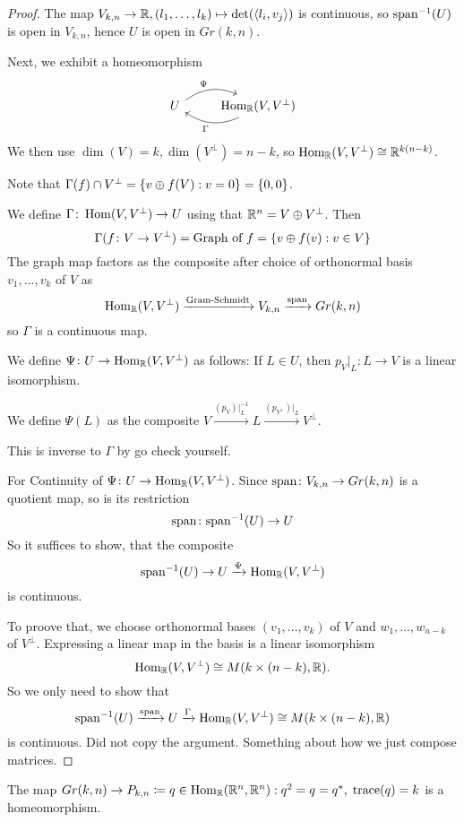 \documentclass[language=english]{TemplateLecture}
\begin{document}
\begin{proof}
    The map \(V_{k,n} \to \mathbb{R}, (l_1, \dots, l_k) \mapsto \det(\langle l_i, v_j\rangle)\) is continuous, so \(\mathrm{span}^{-1}(U)\) is open in \(V_{k,n}\), hence \(U\) is open in \(Gr(k,n)\).

    Next, we exhibit a homeomorphism
    \[\begin{tikzcd}
        U \ar[r, bend left, "\Psi"] & {\Hom_\IR(V, V^\perp)} \ar[l, bend left, "\Gamma"]
    \end{tikzcd}\]
    We then use \(\dim(V) = k, \dim(V^\perp) = n-k\), so \(\operatorname{Hom}_{\mathbb{R}}(V, V^\perp) \cong \mathbb{R}^{k(n-k)}\).

    Note that \(\Gamma(f) \cap V^\perp = \{v \oplus f(V) : v = 0\} = \{0,0\}\).

    We define \(\Gamma\colon \operatorname{Hom}(V, V^\perp) \to U\) using that \(\mathbb{R}^n = V \oplus V^\perp\). Then
    \[\Gamma(f\colon V \to V^\perp) = \text{Graph of } f = \{v \oplus f(v) : v \in V\}\]
    The graph map factors as the composite after choice of orthonormal basis \(v_1, \dots, v_k\) of \(V\) as
    \[\operatorname{Hom}_{\mathbb{R}}(V, V^\perp) \xrightarrow{\text{Gram-Schmidt}} V_{k,n} \xrightarrow{\mathrm{span}} Gr(k,n)\]
    so \(\Gamma\) is a continuous map.

    We define \(\Psi \colon U \to \operatorname{Hom}_{\mathbb{R}}(V, V^\perp)\) as follows: If \(L \in U\), then \(p_V\rvert_L \colon L \to V\) is a linear isomorphism.

    We define \(\Psi(L)\) as the composite \(V \xrightarrow{(p_V)\rvert_L^{-1}} L \xrightarrow{(p_{V^\perp})\rvert_L} V^\perp\).

    This is inverse to \(\Gamma\) by go check yourself.

    For Continuity of \(\Psi\colon U \to \operatorname{Hom}_{\mathbb{R}}(V, V^\perp)\). Since \(\mathrm{span}\colon V_{k,n} \to Gr(k,n)\) is a quotient map, so is its restriction
    \[\mathrm{span}\colon \mathrm{span}^{-1}(U) \to U\]
    So it suffices to show, that the composite
    \[\mathrm{span}^{-1}(U) \to U \xrightarrow{\Psi} \operatorname{Hom}_{\mathbb{R}}(V, V^\perp)\]
    is continuous.

    To proove that, we choose orthonormal bases \((v_1, \dots, v_k)\) of \(V\) and \(w_1, \dots, w_{n-k}\) of \(V^\perp\). Expressing a linear map in the basis is a linear isomorphism
    \[\operatorname{Hom}_{\mathbb{R}}(V, V^\perp) \cong M(k \times (n-k), \mathbb{R}).\]
    So we only need to show that
    \[\mathrm{span}^{-1}(U) \xrightarrow{\mathrm{span}} U \xrightarrow{\Gamma} \operatorname{Hom}_{\mathbb{R}}(V, V^\perp) \cong M(k \times (n-k), \mathbb{R})\]
    is continuous. Did not copy the argument. Something about how we just compose matrices.
\end{proof}


\begin{corollary}
    The map \(Gr(k,n) \to P_{k,n} \coloneq {q \in \operatorname{Hom}_{\mathbb{R}}(\mathbb{R}^n, \mathbb{R}^n) : q^2 = q = q^*, \; \mathrm{trace}(q) = k}\) is a homeomorphism.
\end{corollary}
\end{document}
